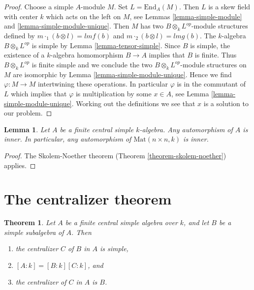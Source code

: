 \documentclass{stacks-project}
\theoremstyle{plain}
\newtheorem{theorem}[subsection]{Theorem}
\newtheorem{lemma}[subsection]{Lemma}
\theoremstyle{definition}
\theoremstyle{remark}
\numberwithin{equation}{subsection}
\begin{document}
\begin{proof}
Choose a simple $A$-module $M$. Set $L = \text{End}_A(M)$.
Then $L$ is a skew field with center $k$ which acts on the left on $M$, see
Lemmas \ref{lemma-simple-module} and \ref{lemma-simple-module-unique}.
Then $M$ has two $B \otimes_k L^{op}$-module structures defined by
$m \cdot_1 (b \otimes l) = lmf(b)$ and $m \cdot_2 (b \otimes l) = lmg(b)$.
The $k$-algebra $B \otimes_k L^{op}$ is simple by
Lemma \ref{lemma-tensor-simple}. Since $B$ is simple, the existence of a
$k$-algebra homomorphism $B \to A$ implies that $B$ is finite. Thus
$B \otimes_k L^{op}$ is finite simple and we conclude the two
$B \otimes_k L^{op}$-module structures on $M$
are isomorphic by Lemma \ref{lemma-simple-module-unique}.
Hence we find $\varphi : M \to M$ intertwining these operations.
In particular $\varphi$ is in the commutant of $L$ which implies that
$\varphi$ is multiplication by some $x \in A$, see
Lemma \ref{lemma-simple-module-unique}. Working out the definitions we see
that $x$ is a solution to our problem.
\end{proof}

\begin{lemma}
\label{lemma-automorphism-inner}
Let $A$ be a finite central simple $k$-algebra. Any automorphism of $A$ is
inner. In particular, any automorphism of $\text{Mat}(n \times n, k)$
is inner.
\end{lemma}

\begin{proof}
The Skolem-Noether theorem (Theorem \ref{theorem-skolem-noether})
applies.
\end{proof}



\section{The centralizer theorem}
\label{section-centralizer}


\begin{theorem}
\label{theorem-centralizer}
Let $A$ be a finite central simple algebra over $k$, and let
$B$ be a simple subalgebra of $A$. Then
\begin{enumerate}
\item the centralizer $C$ of $B$ in $A$ is simple,
\item $[A : k] = [B : k][C : k]$, and
\item the centralizer of $C$ in $A$ is $B$.
\end{enumerate}
\end{theorem}
\end{document}

